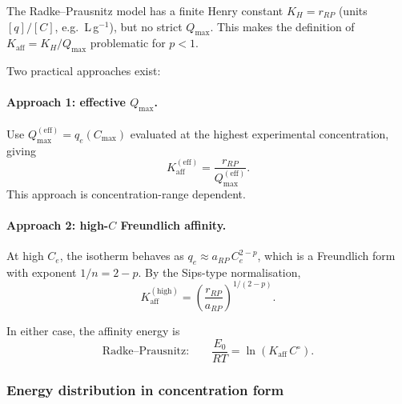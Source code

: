 \documentclass[12pt]{article}
\begin{document}
	The Radke--Prausnitz model has a finite Henry constant
	$K_H = r_{RP}$ (units $[q]/[C]$, e.g.\ L\,g$^{-1}$), but
	no strict $Q_{\max}$.  This makes the definition of
	$K_{\mathrm{aff}} = K_H / Q_{\max}$ problematic for
	$p < 1$.

	Two practical approaches exist:

	\paragraph{Approach 1: effective $Q_{\max}$.}
	Use $Q_{\max}^{\mathrm{(eff)}} = q_e(C_{\max})$ evaluated at
	the highest experimental concentration, giving
	\begin{equation}
		K_{\mathrm{aff}}^{\mathrm{(eff)}}
		= \frac{r_{RP}}{Q_{\max}^{\mathrm{(eff)}}}.
	\end{equation}
	This approach is concentration-range dependent.

	\paragraph{Approach 2: high-$C$ Freundlich affinity.}
	At high $C_e$, the isotherm behaves as
	$q_e \approx a_{RP}\,C_e^{2-p}$, which is a Freundlich form
	with exponent $1/n = 2 - p$.  By the Sips-type normalisation,
	\begin{equation}
		K_{\mathrm{aff}}^{\mathrm{(high)}}
		= \left(\frac{r_{RP}}{a_{RP}}\right)^{1/(2-p)}.
		\label{eq:Kaff_RadkePrausnitz}
	\end{equation}

	In either case, the affinity energy is
	\begin{equation}
		\text{Radke--Prausnitz:}\qquad
		\frac{E_0}{RT}
		= \ln(K_{\mathrm{aff}}\,C^\circ).
		\label{eq:E_RadkePrausnitz}
	\end{equation}

	\subsubsection{Energy distribution in concentration form}
\end{document}
